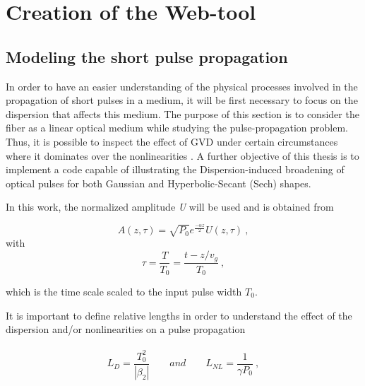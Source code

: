 \chapter{Creation of the Web-tool}



 \section{Modeling the short  pulse propagation}
    In order to have an easier understanding of the physical processes involved in the propagation of short pulses in a medium, it will be first necessary to focus on the dispersion that affects this medium. The purpose of this section is to consider the fiber as a linear optical medium while studying the pulse-propagation problem. Thus, it is possible to inspect the effect of GVD under certain circumstances where it dominates over the nonlinearities \citep{ AgrawalBook}. A further objective of this thesis is to implement a code capable of illustrating the Dispersion-induced broadening of optical pulses for both Gaussian and Hyperbolic-Secant (Sech) shapes.


    In this work, the normalized amplitude \emph{U} will be used and is obtained from  
  
            \begin{equation}\label{eq_A0}
                A(z,\tau ) = \sqrt{P_0}e^{\frac{-\alpha z}{2}} U(z,\tau) \ ,
            \end{equation}
            with
            \begin{equation}
                \tau =  \frac{T}{T_0} = \frac{t-z/v_g}{T_0} \ ,
            \end{equation}
        
        which is the time scale scaled to the input pulse width $T_0$.
        
        
        It is important to define relative lengths in order to understand the effect of the dispersion and/or nonlinearities on a pulse propagation
            \ \\
            \ \\
            \begin{equation}
                L_D = \frac{T^2_0}{|\beta_2|} \qquad and \qquad L_{NL} = \frac{1}{\gamma P_0} \ ,
            \end{equation}
        
